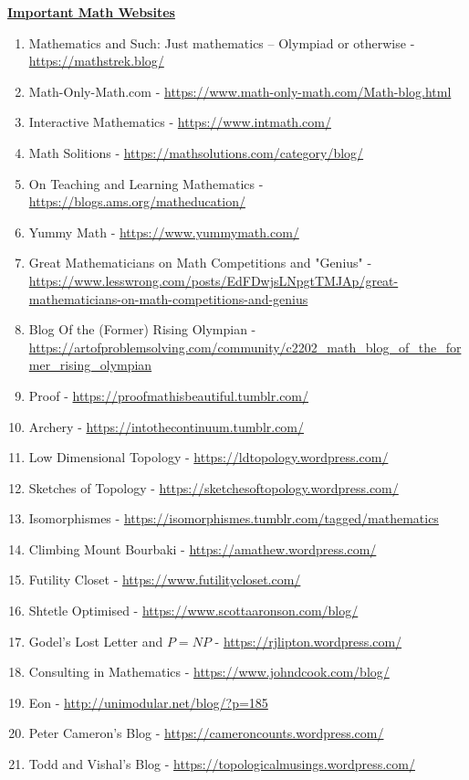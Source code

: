 \documentclass{article}
\begin{document}
\textbf  {\Huge {\underline {Important Math Websites }}}
\begin{enumerate}
\item Mathematics and Such: Just mathematics – Olympiad or otherwise - \url{https://mathstrek.blog/}
\item Math-Only-Math.com - \url{https://www.math-only-math.com/Math-blog.html}
\item Interactive Mathematics - \url{https://www.intmath.com/}
\item Math Solitions - \url{https://mathsolutions.com/category/blog/}
\item On Teaching and Learning Mathematics  - \url{https://blogs.ams.org/matheducation/}
\item Yummy Math - \url{https://www.yummymath.com/}
\item Great Mathematicians on Math Competitions and "Genius" - \url{https://www.lesswrong.com/posts/EdFDwjsLNpgtTMJAp/great-mathematicians-on-math-competitions-and-genius}
\item Blog Of the (Former) Rising Olympian - \url{https://artofproblemsolving.com/community/c2202_math_blog_of_the_former_rising_olympian}
\item Proof - \url{https://proofmathisbeautiful.tumblr.com/}
\item Archery - \url{https://intothecontinuum.tumblr.com/}
\item Low Dimensional Topology - \url{https://ldtopology.wordpress.com/}
\item Sketches of Topology - \url{https://sketchesoftopology.wordpress.com/}
\item Isomorphismes - \url{https://isomorphismes.tumblr.com/tagged/mathematics}
\item Climbing Mount Bourbaki - \url{https://amathew.wordpress.com/}
\item Futility Closet - \url{https://www.futilitycloset.com/}
\item Shtetle Optimised - \url{https://www.scottaaronson.com/blog/}
\item Godel's Lost Letter and $P=NP$ - \url{https://rjlipton.wordpress.com/}
\item Consulting in Mathematics - \url{https://www.johndcook.com/blog/}
\item Eon - \url{http://unimodular.net/blog/?p=185}
\item Peter Cameron's Blog - \url{https://cameroncounts.wordpress.com/}
\item Todd and Vishal's Blog - \url{https://topologicalmusings.wordpress.com/}

\end{enumerate}
\end{document}
